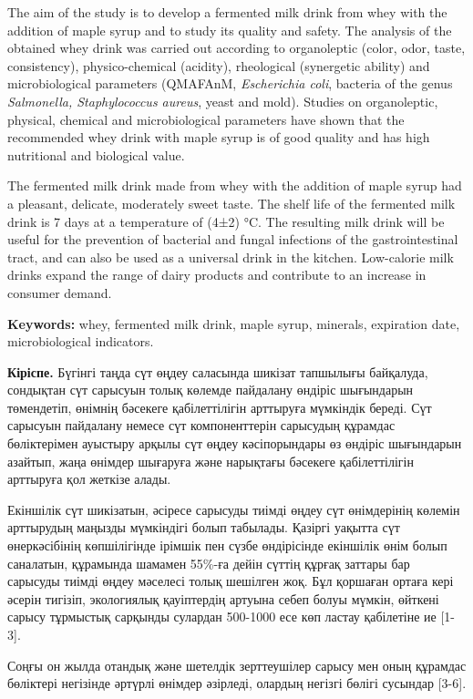 {{The aim of the study is to develop a fermented milk drink from whey with
the addition of maple syrup and to study its quality and safety. The
analysis of the obtained whey drink was carried out according to
organoleptic (color, odor, taste, consistency), physico-chemical
(acidity), rheological (synergetic ability) and microbiological
parameters (QMAFAnM, \emph{Escherichia coli}, bacteria of the genus
\emph{Salmonella, Staphylococcus aureus}, yeast and mold). Studies on
organoleptic, physical, chemical and microbiological parameters have
shown that the recommended whey drink with maple syrup is of good
quality and has high nutritional and biological value.

The fermented milk drink made from whey with the addition of maple syrup
had a pleasant, delicate, moderately sweet taste. The shelf life of the
fermented milk drink is 7 days at a temperature of (4±2) °C. The
resulting milk drink will be useful for the prevention of bacterial and
fungal infections of the gastrointestinal tract, and can also be used as
a universal drink in the kitchen. Low-calorie milk drinks expand the
range of dairy products and contribute to an increase in consumer
demand.

{\bfseries Keywords:} whey, fermented milk drink, maple syrup, minerals,
expiration date, microbiological indicators.

{\bfseries Кіріспе.} Бүгінгі таңда сүт өңдеу саласында шикізат тапшылығы
байқалуда, сондықтан сүт сарысуын толық көлемде пайдалану өндіріс
шығындарын төмендетіп, өнімнің бәсекеге қабілеттілігін арттыруға
мүмкіндік береді. Сүт сарысуын пайдалану немесе сүт компоненттерін
сарысудың құрамдас бөліктерімен ауыстыру арқылы сүт өңдеу кәсіпорындары
өз өндіріс шығындарын азайтып, жаңа өнімдер шығаруға және нарықтағы
бәсекеге қабілеттілігін арттыруға қол жеткізе алады.

Екіншілік сүт шикізатын, әсіресе сарысуды тиімді өңдеу сүт өнімдерінің
көлемін арттырудың маңызды мүмкіндігі болып табылады. Қазіргі уақытта
сүт өнеркәсібінің көпшілігінде ірімшік пен сүзбе өндірісінде екіншілік
өнім болып саналатын, құрамында шамамен 55\%-ға дейін сүттің құрғақ
заттары бар сарысуды тиімді өңдеу мәселесі толық шешілген жоқ. Бұл
қоршаған ортаға кері әсерін тигізіп, экологиялық қауіптердің артуына
себеп болуы мүмкін, өйткені сарысу тұрмыстық сарқынды сулардан 500-1000
есе көп ластау қабілетіне ие {[}1-3{]}.

Соңғы он жылда отандық және шетелдік зерттеушілер сарысу мен оның
құрамдас бөліктері негізінде әртүрлі өнімдер әзірледі, олардың негізгі
бөлігі сусындар {[}3-6{]}.

}}
